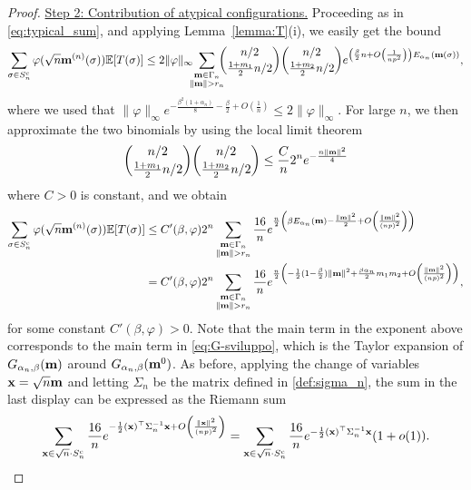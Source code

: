 \documentclass[11pt,oneside]{amsart}
\numberwithin{equation}{section}  %
\theoremstyle{plain}
\theoremstyle{remark}
\def \E {{\mathbb E}}
\def \G {{\Gamma}}
\def \bm {{\bf m}}
\begin{document}
\begin{proof}
\noindent
\underline{Step 2: Contribution of atypical configurations.} 
Proceeding as in \eqref{eq:typical_sum}, and applying Lemma~\ref{lemma:T}(i), we easily get the bound
\begin{equation*}
\sum_{\sigma \in S_n^c} \varphi(\sqrt{n} \bm^{(n)}(\sigma)) \E[T(\sigma)] \le 2\|\varphi\|_\infty \!\!\!
\sum_{\substack{\bm \in \G_n\\ \|\bm\|> r_n}} \!\!\!\!
  \binom{n/2}{\frac{1+m_1}{2}n/2}\binom{n/2}{\frac{1+m_2}{2}n/2}e^{\left(\frac{\beta}{2}n+O\left(\frac{1}{np^2}\right)\right) E_{\alpha_n}(\bm (\sigma))},
\end{equation*}
where we used that $\|\varphi\|_\infty e^{- \frac{\beta^2(1+\alpha_n)}{8}-\frac{\beta}{2}+O\left(\frac{1}{n}\right)} \leq 2\|\varphi\|_\infty $. For large $n$, 
we then approximate the two binomials by using the local limit theorem
\begin{align}
\label{eq:binomialLLT}
    \binom{n/2}{\frac{1+m_1}{2}n/2} \binom{n/2}{\frac{1+m_2}{2}n/2}\leq \frac{C}{n} 2^ne^{ -\frac{n \| \bm \|^2}{4} }
\end{align}
where $C > 0$ is constant, and we obtain
\begin{align*}
        \sum_{\sigma \in S_n^c} \varphi(\sqrt{n} \bm^{(n)}(\sigma)) \E[T(\sigma)] 
        &\le 
        C'(\beta,\varphi) 2^n \sum_{\substack{\bm \in \G_n\\ \|\bm\|> r_n}} \frac{16}{n}
 e^{\frac{n}{2} \left( \beta E_{\alpha_n}(\bm) -\frac{\| \bm \|^2}{2}+O\left(\frac{\|\bm\|^2}{(np)^2}\right)\right)}\\
 & = C'(\beta,\varphi) 2^n \sum_{\substack{\bm \in \G_n\\ \|\bm\|> r_n}} 
 \frac{16}{n}
 e^{\frac{n}{2} \left( -\frac{1}{2}(1-\frac{\beta}{2})\|\bm\|^2 +\frac{\beta\alpha_n}{2}m_1m_2 +O\left(\frac{\|\bm\|^2}{(np)^2}\right)\right)},
 \end{align*}
for some constant $C'(\beta,\varphi)>0$.
Note that the main term in the exponent above corresponds to the main term in \eqref{eq:G-sviluppo}, which is the Taylor expansion of
$G_{\alpha_n,\beta}(\bm)$ around $G_{\alpha_n,\beta}(\bm^0)$. 
As before, applying the change of variables ${\bf x}=\sqrt{n}\bm$  
and letting $\Sigma_n$ be the matrix defined in \eqref{def:sigma_n}, 
the sum in the last display can be expressed as the Riemann sum
$$
\sum_{ {\bf x}\in \sqrt{n}\cdot S_{n}^c}
\frac{16}{n}
 e^{-\frac{1}{2} ({\bf x})^\top \Sigma_n^{-1} {\bf x} + O\left(\frac{\|{\bf x}\|^2}{(np)^2}\right)}
 =
 \sum_{ {\bf x}\in \sqrt{n}\cdot S_{n}^c}
\frac{16}{n}
 e^{-\frac{1}{2} ({\bf x})^\top \Sigma_n^{-1} {\bf x}}(1+o(1)).
$$
\end{proof}
\end{document}
